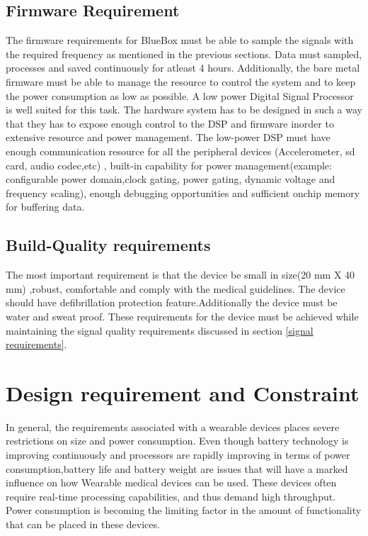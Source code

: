 \subsection{Firmware Requirement }
\hspace{10mm}The firmware requirements for BlueBox  must be able to sample the signals with the required frequency as mentioned in the previous sections. Data must sampled, processes and saved continuously for atleast 4 hours. Additionally, the bare metal firmware must be able to manage the resource to control the system and to keep the power consumption as low as possible. A low power Digital Signal Processor is well suited for this task. The hardware system has to be designed in such a way that they has to expose enough control to the DSP and firmware inorder to extensive resource and power management. The low-power DSP must have enough communication resource for all the peripheral devices (Accelerometer, sd card, audio codec,etc) , built-in capability for power management(example: configurable power domain,clock gating, power gating, dynamic voltage and frequency scaling), enough debugging opportunities and sufficient onchip memory for buffering data. 

\subsection {Build-Quality requirements} 
\hspace{10mm}The most important requirement is that the device be small in size(20 mm X 40 mm) ,robust, comfortable and comply with the medical guidelines. The device should have defibrillation protection feature.Additionally the device must be water and sweat proof. These requirements for the device must be achieved while maintaining the signal quality requirements discussed in section \ref{signal requirements}.  

\section {Design requirement and Constraint} 
In general, the requirements associated with a wearable devices places severe restrictions on size and power consumption. Even though battery technology is improving continuously and processors are rapidly improving in terms of power consumption,battery life and battery weight are issues that will have a marked influence on how  Wearable medical devices can be used. These devices often require real-time processing capabilities, and thus demand high throughput. Power consumption is becoming the limiting factor in the amount of functionality that can be placed in these devices. 

